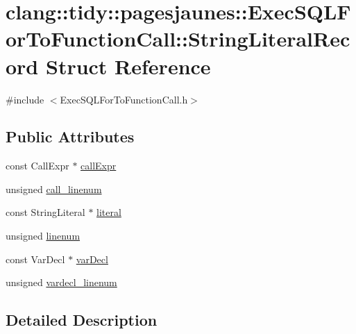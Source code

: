 \hypertarget{structclang_1_1tidy_1_1pagesjaunes_1_1_exec_s_q_l_for_to_function_call_1_1_string_literal_record}{}\section{clang\+:\+:tidy\+:\+:pagesjaunes\+:\+:Exec\+S\+Q\+L\+For\+To\+Function\+Call\+:\+:String\+Literal\+Record Struct Reference}
\label{structclang_1_1tidy_1_1pagesjaunes_1_1_exec_s_q_l_for_to_function_call_1_1_string_literal_record}


{\ttfamily \#include $<$Exec\+S\+Q\+L\+For\+To\+Function\+Call.\+h$>$}

\subsection*{Public Attributes}
\begin{DoxyCompactItemize}
\item 
const Call\+Expr $\ast$ \hyperlink{structclang_1_1tidy_1_1pagesjaunes_1_1_exec_s_q_l_for_to_function_call_1_1_string_literal_record_a9a302bb6cc0394685c841837d84e98be}{call\+Expr}
\item 
unsigned \hyperlink{structclang_1_1tidy_1_1pagesjaunes_1_1_exec_s_q_l_for_to_function_call_1_1_string_literal_record_adf25e796981c00f95362e2217d1c602e}{call\+\_\+linenum}
\item 
const String\+Literal $\ast$ \hyperlink{structclang_1_1tidy_1_1pagesjaunes_1_1_exec_s_q_l_for_to_function_call_1_1_string_literal_record_a5b7f52b7ca6ac5b180e4403836026e03}{literal}
\item 
unsigned \hyperlink{structclang_1_1tidy_1_1pagesjaunes_1_1_exec_s_q_l_for_to_function_call_1_1_string_literal_record_a2a150ab2414836938830249c391b8a55}{linenum}
\item 
const Var\+Decl $\ast$ \hyperlink{structclang_1_1tidy_1_1pagesjaunes_1_1_exec_s_q_l_for_to_function_call_1_1_string_literal_record_aeb706a283b13672e679f772ab399dc1b}{var\+Decl}
\item 
unsigned \hyperlink{structclang_1_1tidy_1_1pagesjaunes_1_1_exec_s_q_l_for_to_function_call_1_1_string_literal_record_ae2961a489b70aed8015e95e6aee4f533}{vardecl\+\_\+linenum}
\end{DoxyCompactItemize}


\subsection{Detailed Description}



